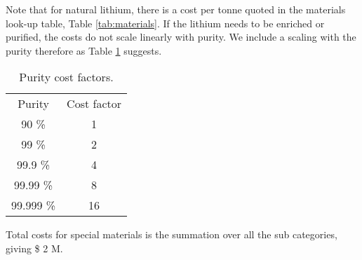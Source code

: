 Note that for natural lithium, there is a cost per tonne quoted in the materials look-up table, Table \ref{tab:materials}.  If the lithium needs to be enriched or purified, the costs do not scale linearly with purity.  We include a scaling with the purity therefore as Table \ref{tab:purity} suggests.

\begin{table}[]
    \centering
    \begin{tabular}{c|c}
       Purity  &  Cost factor \\
       90 \%  &  1 \\
       99 \%  &  2 \\
       99.9 \%  &  4 \\
       99.99 \%  &  8 \\
       99.999 \%  &  16 \\
    \end{tabular}
    \caption{Purity cost factors.}
    \label{tab:purity}
\end{table}

Total costs for special materials is the summation over all the sub categories, giving \$ 2 M.  



